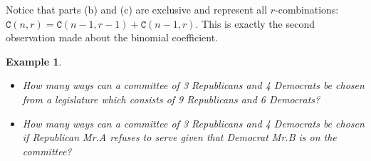 \documentclass[12pt, letterpaper, onecolumn, conference, final]{IEEEtran}
\theoremstyle{definition}
\theoremstyle{plain}
\newtheorem{example}{Example}[section]
\begin{document}
\noindent
Notice that parts (b) and (c) are exclusive and represent all $r$-combinations: $\mathtt{C}(n,r) = \mathtt{C}(n-1,r-1) + \mathtt{C}(n-1,r)$. This is exactly the second observation made about the binomial coefficient.

\begin{example}
\hfill
\begin{itemize}

\item[(a)]
How many ways can a committee of 3 Republicans and 4 Democrats be chosen from a legislature which consists of 9 Republicans and 6 Democrats?

\vspace{.2cm}
\item[(b)]
How many ways can a committee of 3 Republicans and 4 Democrats be chosen if Republican Mr.A refuses to serve given that Democrat Mr.B is on the committee?

\end{itemize}
\end{example}
\end{document}
